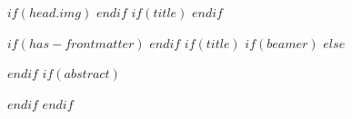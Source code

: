 
\pagestyle{fancy}
\fancyhead{} %
$if(head.img)$
$endif$
$if(title)$
$endif$

\sectionfont{\color{odapred}\sectionrule{3ex}{2pt}{-1ex}{0.5pt}} %

$if(has-frontmatter)$
\frontmatter
$endif$
$if(title)$
$if(beamer)$
\frame{\titlepage}
$else$
{\color{odapred}\maketitle}
$endif$
$if(abstract)$
\begin{abstract}
$abstract$
\end{abstract}
$endif$
$endif$
